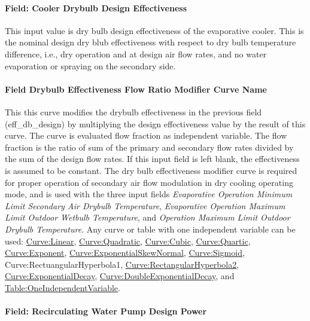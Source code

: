\paragraph{Field: Cooler Drybulb Design Effectiveness}\label{field-cooler-drybulb-design-effectiveness}

This input value is dry bulb design effectiveness of the evaporative cooler. This is the nominal design dry blub effectiveness with respect to dry bulb temperature difference, i.e., dry operation and at design air flow rates, and no water evaporation or spraying on the secondary side.

\paragraph{Field Drybulb Effectiveness Flow Ratio Modifier Curve Name}\label{field-drybulb-effectiveness-flow-ratio-modifier-curve-name}

This this curve modifies the drybulb effectiveness in the previous field (eff\_db\_design) by multiplying the design effectiveness value by the result of this curve. The curve is evaluated flow fraction as independent variable. The flow fraction is the ratio of sum of the primary and secondary flow rates divided by the sum of the design flow rates. If this input field is left blank, the effectiveness is assumed to be constant. The dry bulb effectiveness modifier curve is required for proper operation of secondary air flow modulation in dry cooling operating mode, and is used with the three input fields \textit{Evaporative Operation Minimum Limit Secondary Air Drybulb Temperature}, \textit{Evaporative Operation Maximum Limit Outdoor Wetbulb Temperature}, and \textit{Operation Maximum Limit Outdoor Drybulb Temperature}. Any curve or table with one independent variable can be used: \hyperref[curvelinear]{Curve:Linear}, \hyperref[curvequadratic]{Curve:Quadratic}, \hyperref[curvecubic]{Curve:Cubic}, \hyperref[curvequartic]{Curve:Quartic}, \hyperref[curveexponent]{Curve:Exponent}, \hyperref[curveexponentialskewnormal]{Curve:ExponentialSkewNormal}, \hyperref[curvesigmoid]{Curve:Sigmoid}, Curve:RectuangularHyperbola1, \hyperref[curverectangularhyperbola2]{Curve:RectangularHyperbola2}, \hyperref[curveexponentialdecay]{Curve:ExponentialDecay}, \hyperref[curvedoubleexponentialdecay]{Curve:DoubleExponentialDecay}, and \hyperref[tableoneindependentvariable]{Table:OneIndependentVariable}.

\paragraph{Field: Recirculating Water Pump Design Power}\label{field-recirculating-water-pump-design-power}

